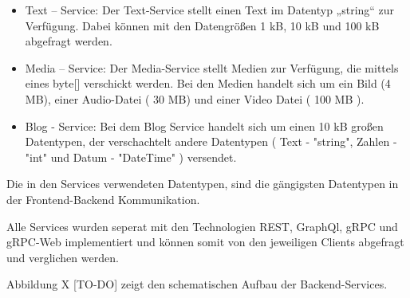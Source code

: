 \begin{itemize}
	\item Text – Service: 
	Der Text-Service stellt einen Text im Datentyp „string“ zur Verfügung. Dabei können mit den Datengrößen 1 kB, 10 kB und 100 kB abgefragt werden.
	
	\item Media – Service:
	Der Media-Service stellt Medien zur Verfügung, die mittels eines byte[] verschickt werden. Bei den Medien handelt sich um ein Bild (4 MB), einer Audio-Datei ( 30 MB) und einer Video Datei ( 100 MB ). 
	
	\item Blog - Service: 
	Bei dem Blog Service handelt sich um einen 10 kB großen Datentypen, der verschachtelt andere Datentypen ( Text - "string", Zahlen - "int" und Datum - "DateTime" ) versendet.
	
\end{itemize}

Die in den Services verwendeten Datentypen, sind die gängigsten Datentypen in der Frontend-Backend Kommunikation.

Alle Services wurden seperat mit den Technologien REST, GraphQl, gRPC und gRPC-Web implementiert und können somit von den jeweiligen Clients abgefragt und verglichen werden.

Abbildung X [TO-DO] zeigt den schematischen Aufbau der Backend-Services.

